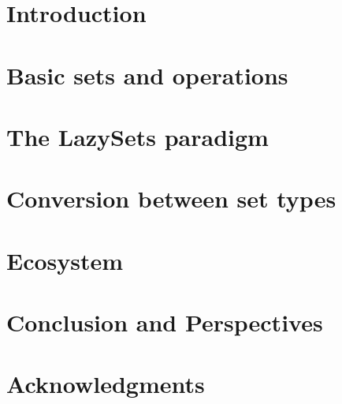 \documentclass{juliacon}
\begin{document}


\maketitle

\begin{abstract}

\end{abstract}

\renewcommand{\thefootnote}{\fnsymbol{footnote}}
\renewcommand{\thefootnote}{\arabic{footnote}}

\section{Introduction}



\section{Basic sets and operations} \label{sec:basic}



\section{The LazySets paradigm} \label{sec:lazy}



\section{Conversion between set types} \label{sec:approx}



\section{Ecosystem} \label{sec:applications}



\section{Conclusion and Perspectives} \label{sec:conclusion}



\section*{Acknowledgments}






\end{document}
